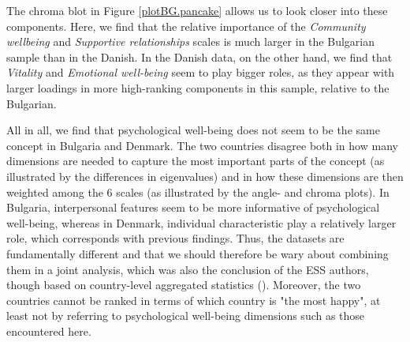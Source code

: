 \documentclass[titlepage,11pt,twoside]{article}
\begin{document}
{The chroma blot in Figure \ref{plotBG.pancake} allows us to look closer into these components. Here, we find that the relative importance of the \textit{Community wellbeing} and \textit{Supportive relationships} scales is much larger in the Bulgarian sample than in the Danish. In the Danish data, on the other hand, we find that \textit{Vitality} and \textit{Emotional well-being} seem to play bigger roles, as they appear with larger loadings in more high-ranking components in this sample, relative to the Bulgarian.

All in all, we find that psychological well-being does not seem to be the same concept in Bulgaria and Denmark. The two countries disagree both in how many dimensions are needed to capture the most important parts of the concept (as illustrated by the differences in eigenvalues) and in how these dimensions are then weighted among the 6 scales (as illustrated by the angle- and chroma plots). In Bulgaria, interpersonal features seem to be more informative of psychological well-being, whereas in Denmark, individual characteristic play a relatively larger role, which corresponds with previous findings. Thus, the datasets are fundamentally different and that we should therefore be wary about combining them in a joint analysis, which was also the conclusion of the ESS authors, though based on country-level aggregated statistics (\cite{ESStopline5}). Moreover, the two countries cannot be ranked in terms of which country is "the most happy", at least not by referring to psychological well-being dimensions such as those encountered here.




}
\end{document}
